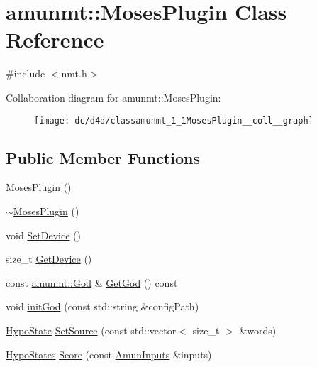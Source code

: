 \hypertarget{classamunmt_1_1MosesPlugin}{}\section{amunmt\+:\+:Moses\+Plugin Class Reference}
\label{classamunmt_1_1MosesPlugin}


{\ttfamily \#include $<$nmt.\+h$>$}



Collaboration diagram for amunmt\+:\+:Moses\+Plugin\+:
\nopagebreak
\begin{figure}[H]
\begin{center}
\leavevmode
\texttt{[image: dc/d4d/classamunmt\_1\_1MosesPlugin\_\_coll\_\_graph]}
\end{center}
\end{figure}
\subsection*{Public Member Functions}
\begin{DoxyCompactItemize}
\item 
\hyperlink{classamunmt_1_1MosesPlugin_a6b6ac85a09e5e1d2f59832270e297d10}{Moses\+Plugin} ()
\item 
\hyperlink{classamunmt_1_1MosesPlugin_a4cf0e80cbe5dbb41aad8439ed0c017e2}{$\sim$\+Moses\+Plugin} ()
\item 
void \hyperlink{classamunmt_1_1MosesPlugin_a7dc4be454151129de1b078b26d994e61}{Set\+Device} ()
\item 
size\+\_\+t \hyperlink{classamunmt_1_1MosesPlugin_aac74e782d9d7da7e098ea8fc684ef2e7}{Get\+Device} ()
\item 
const \hyperlink{classamunmt_1_1God}{amunmt\+::\+God} \& \hyperlink{classamunmt_1_1MosesPlugin_a297677460151491e90a579da01134fbc}{Get\+God} () const 
\item 
void \hyperlink{classamunmt_1_1MosesPlugin_a2e31053e2017170243ec920034d2cffe}{init\+God} (const std\+::string \&config\+Path)
\item 
\hyperlink{structamunmt_1_1HypoState}{Hypo\+State} \hyperlink{classamunmt_1_1MosesPlugin_ac47178604826bfe65710f1647fe0eb48}{Set\+Source} (const std\+::vector$<$ size\+\_\+t $>$ \&words)
\item 
\hyperlink{namespaceamunmt_acca30714a48f384cccf36370d6869b40}{Hypo\+States} \hyperlink{classamunmt_1_1MosesPlugin_adfad6d011db069e2a3c07c3188c9ad25}{Score} (const \hyperlink{namespaceamunmt_a5a9307eef76c887cbe1a67e780437eae}{Amun\+Inputs} \&inputs)
\end{DoxyCompactItemize}
